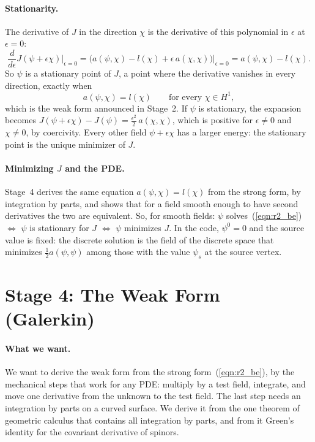 \paragraph{Stationarity.} The derivative of $J$ in the direction $\chi$ is the derivative of this polynomial in $\epsilon$ at $\epsilon = 0$:
\begin{equation*}
\frac{d}{d\epsilon}J(\psi + \epsilon\chi)\Big|_{\epsilon = 0} = \big(a(\psi, \chi) - l(\chi) + \epsilon\, a(\chi, \chi)\big)\Big|_{\epsilon = 0} = a(\psi, \chi) - l(\chi) .
\end{equation*}
So $\psi$ is a stationary point of $J$, a point where the derivative vanishes in every direction, exactly when
\begin{equation*}
a(\psi, \chi) = l(\chi) \qquad\text{for every } \chi \in H^1 ,
\end{equation*}
which is the weak form announced in Stage~2. If $\psi$ is stationary, the expansion becomes $J(\psi + \epsilon\chi) - J(\psi) = \frac{\epsilon^2}2\, a(\chi, \chi)$, which is positive for $\epsilon \ne 0$ and $\chi \ne 0$, by coercivity. Every other field $\psi + \epsilon\chi$ has a larger energy: the stationary point is the unique minimizer of $J$.

\paragraph{Minimizing $J$ and the PDE.} Stage~4 derives the same equation $a(\psi, \chi) = l(\chi)$ from the strong form, by integration by parts, and shows that for a field smooth enough to have second derivatives the two are equivalent. So, for smooth fields: $\psi$ solves~(\ref{eqn:r2_be}) $\iff$ $\psi$ is stationary for $J$ $\iff$ $\psi$ minimizes $J$. In the code, $\psi^0 = 0$ and the source value is fixed: the discrete solution is the field of the discrete space that minimizes $\frac12 a(\psi, \psi)$ among those with the value $\psi_s$ at the source vertex.

\section{Stage 4: The Weak Form (Galerkin)}
\label{section:r2_stage4}

\paragraph{What we want.} We want to derive the weak form from the strong form~(\ref{eqn:r2_be}), by the mechanical steps that work for any PDE: multiply by a test field, integrate, and move one derivative from the unknown to the test field. The last step needs an integration by parts on a curved surface. We derive it from the one theorem of geometric calculus that contains all integration by parts, and from it Green's identity for the covariant derivative of spinors.

